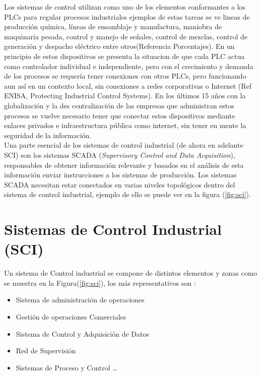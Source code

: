 \documentclass[jou,apacite]{apa6}   %
\begin{document}
Los sistemas de control utilizan como uno de los elementos conformantes  a los PLCs  para regular procesos industriales  ejemplos de estas tareas se ve lineas de producción química, líneas de ensamblaje y manufactura, maniobra de maquinaria pesada,  control y manejo de señales, control de mezclas, control de generación y despacho eléctrico entre otros(Referencia Porcentajes). En un principio de estos dispositivos se presenta la situacion de que cada PLC actua como controlador individual e independiente, pero con el crecimiento y demanda de los procesos se requería tener conexiones con otros PLCs, pero funcionando aun así en un contexto local, sin conexiones a redes corporativas o Internet (Ref ENISA, Protecting Industrial Control Systems). En los últimos 15 años con la globalización y la des centralización de las empresas que administran estos procesos se vuelve necesario tener que conectar estos dispositivos mediante enlaces privados e infraestructura pública como internet, sin tener en mente la seguridad de la información.\\

Una parte esencial de los sistemas de control industrial (de ahora en adelante SCI) son los sistemas SCADA (\textit{Supervisory Control and Data Acquisition}), responsables de obtener información relevante y basados en el análisis de esta información enviar instrucciones a los sistemas de producción. Los sistemas SCADA necesitan estar conectados en varias niveles topológicos dentro del sistema de control industrial,  ejemplo de ello se puede ver en la figura (\ref{fig:sci}). 
\section{Sistemas de Control Industrial (SCI)}
Un sistema de Control industrial se compone de distintos elementos y zonas como se muestra en la Figura(\ref{fig:sci}),  los más representativos son :
\begin{itemize}
  \item Sistema de administración de  operaciones
  \item Gestión de operaciones Comerciales
  \item Sistema de Control y Adquisición de Datos
  \item Red de Supervisión
  \item Sistemas de Proceso y Control \ldots
\end{itemize}
\end{document}

